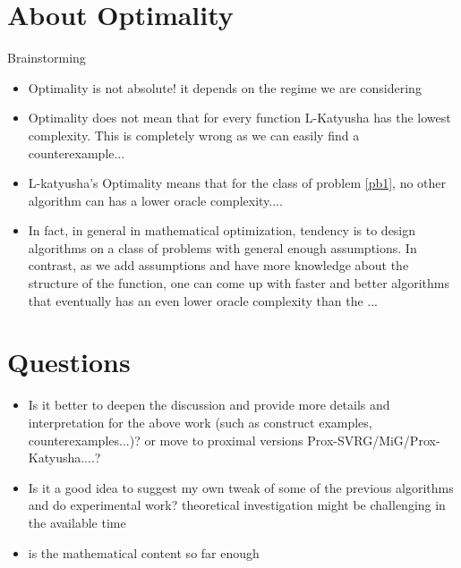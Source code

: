 \documentclass[12pt]{report}
\newcounter{theo}[section]
\begin{document}
\chapter{About Optimality}

Brainstorming
\begin{itemize}
    \item {Optimality is not absolute! it depends on the regime we are considering}
    \item Optimality does not mean that for every function L-Katyusha has the lowest complexity. This is completely wrong as we can easily find a counterexample...
    \item L-katyusha's Optimality means that for the class of problem \ref{pb1}, no other algorithm can has a lower oracle complexity....
    \item In fact, in general in mathematical optimization, tendency is to design algorithms on a class of problems with general enough assumptions. In contrast, as we add assumptions and have more knowledge about the structure of the function, one can come up with faster and better algorithms that eventually has an even lower oracle complexity than the ...
\end{itemize}


\chapter{Questions}
\begin{itemize}
    \item Is it better to deepen the discussion and provide more details and interpretation for the above work (such as construct examples, counterexamples...)?  or move to proximal versions Prox-SVRG/MiG/Prox-Katyusha....?
    \item Is it a good idea to suggest my own tweak of some of the previous algorithms and do experimental work? theoretical investigation might be challenging in the available time
    \item is the mathematical content so far enough
\end{itemize}



{}

\end{document}
